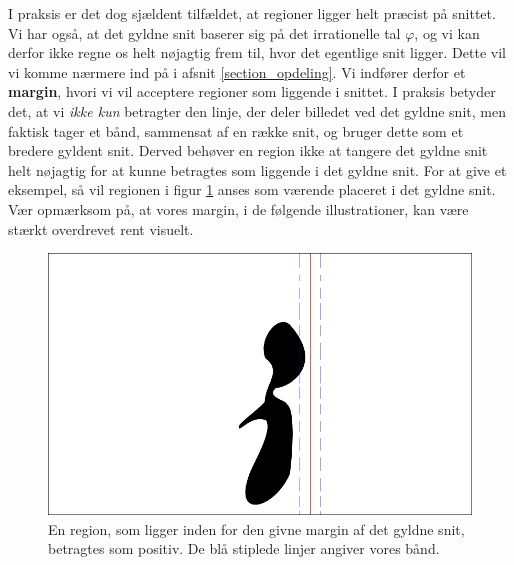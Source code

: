 {I praksis er det dog sjældent tilfældet, at regioner ligger helt præcist
på snittet.
Vi har også, at det gyldne snit baserer sig på det irrationelle tal
$\varphi$, og vi kan derfor ikke regne os helt nøjagtig frem til, hvor
det egentlige snit ligger. Dette vil vi komme nærmere ind på i afsnit
\ref{section_opdeling}. Vi indfører derfor et \textbf{margin}, hvori vi
vil acceptere regioner som liggende i snittet.  I praksis betyder det,
at vi \emph{ikke kun} betragter den linje, der deler billedet ved det
gyldne snit, men faktisk tager et bånd, sammensat af en række snit, og
bruger dette som et bredere gyldent snit.  Derved behøver en region ikke
at tangere det gyldne snit helt nøjagtig for at kunne betragtes som
liggende i det gyldne snit. For at give et eksempel, så vil regionen i
figur \ref{pos_naiv_margin_1} anses som værende placeret i det gyldne
snit.  Vær opmærksom på, at vores margin, i de følgende illustrationer,
kan være stærkt overdrevet rent visuelt.
\begin{figure}[h]
    \begin{center}
        \includegraphics[scale=\imgscale,angle=0]{afsnit/vores_implementation/billeder/naiv_algoritme/naiv_positiv_blob_margin_1}
    \end{center}
    \caption[Positiv region i margen]{En region, som ligger inden for
    den givne margin af det gyldne snit, betragtes som positiv. De blå
    stiplede linjer angiver vores bånd.}
    \label{pos_naiv_margin_1}
\end{figure}

}
